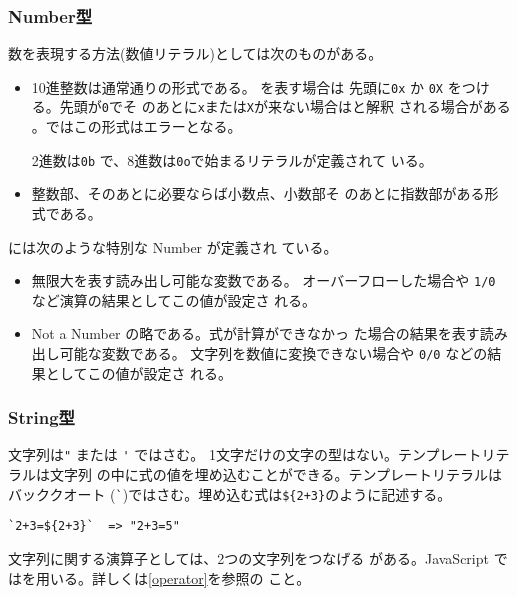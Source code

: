 \subsubsection{Number型}
数を表現する方法(数値リテラル)としては次のものがある。
\begin{itemize}
 \item{\bfseries {}} 10進整数は通常通りの形式である。
      を表す場合は
	      先頭に\Verb+0x+ か \Verb+0X+ をつける。先頭が\Verb+0+でそ
	      のあとに\Verb+x+または\Verb+X+が来ない場合はと解釈
      される場合がある
      。\Strict ではこの形式はエラーとなる。

      2進数は\Verb+0b+ で、8進数は\Verb+0o+で始まるリテラルが定義されて
      いる。
 \item{\bfseries {}} 整数部、そのあとに必要ならば小数点、小数部そ
       のあとに指数部がある形式である。
\end{itemize}
には次のような特別な Number が定義され
ている。
\begin{itemize}
 \item {\bfseries {}}無限大を表す読み出し可能な変数である。
       オーバーフローした場合や \Verb+1/0+ など演算の結果としてこの値が設定さ
       れる。
 \item {\bfseries {}} Not a Number の略である。式が計算ができなかっ
       た場合の結果を表す読み出し可能な変数である。
       文字列を数値に変換できない場合や \Verb+0/0+ などの結果としてこの値が設定さ
       れる。
\end{itemize}
\subsubsection{String型}
文字列は\Verb+"+ または \Verb+'+ ではさむ。%
1文字だけの文字の型はない。テンプレートリテラルは文字列
の中に式の値を埋め込むことができる。テンプレートリテラルはバッククオート
(\Verb+`+)ではさむ。埋め込む式は\texttt{\$\{2+3\}}のように記述する。
\begin{Verbatim}
`2+3=${2+3}`  => "2+3=5"
\end{Verbatim}
文字列に関する演算子としては、2つの文字列をつなげる
がある。JavaScript では\ElmJ{+}を用いる。詳しくは\ref{operator}を参照の
こと。


